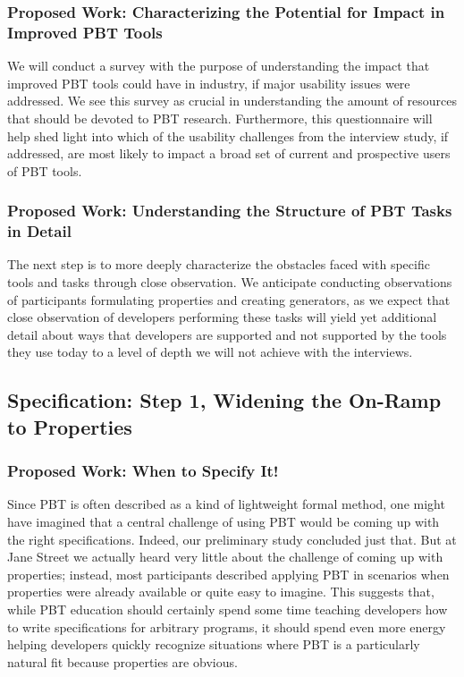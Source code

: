 \subsubsection{Proposed Work: Characterizing the Potential for Impact in Improved PBT Tools}
We will conduct a survey with the purpose of understanding the impact that
improved PBT tools could have in industry, if major usability issues were
addressed. We see this survey as crucial in understanding the amount of
resources that should be devoted to PBT research. Furthermore, this
questionnaire will help shed light into which of the usability challenges from
the interview study, if addressed, are most likely to impact a broad set of
current and prospective users of PBT tools.

\subsubsection{Proposed Work: Understanding the Structure of PBT Tasks in Detail}
The next step is to more deeply characterize the obstacles faced with specific
tools and tasks through close observation. We anticipate conducting observations
of participants formulating properties and creating generators, as we expect
that close observation of developers performing these tasks will yield yet
additional detail about ways that developers are supported and not supported by
the tools they use today to a level of depth we will not achieve with the
interviews.

\subsection{Specification: Step 1, Widening the On-Ramp to Properties }
\subsubsection{Proposed Work: When to Specify It!}
Since PBT is often described as a kind of lightweight formal method, one might
have imagined that a central challenge of using PBT would be coming up with the
right specifications. Indeed, our preliminary study concluded just that. But at
Jane Street we actually heard very little about the challenge of coming up with
properties; instead, most participants described applying PBT in scenarios when
properties were already available or quite easy to imagine. This suggests that,
while PBT education should certainly spend some time teaching developers how to
write specifications for arbitrary programs, it should spend even more energy
helping developers quickly recognize  situations where PBT is a particularly
natural fit because properties are obvious.

